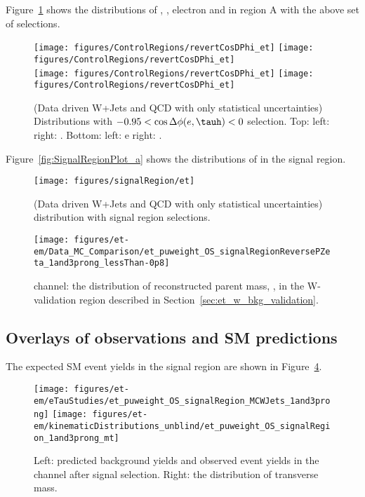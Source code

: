 Figure~\ref{fig:revertCosDPhi_et} shows the distributions of \meffetau, \ETslash, 
electron \pt and \tauh \pt in region A with the above set of selections. 

\begin{figure}\centering
  \texttt{[image: figures/ControlRegions/revertCosDPhi\_et]}
  \texttt{[image: figures/ControlRegions/revertCosDPhi\_et]}\\
  \texttt{[image: figures/ControlRegions/revertCosDPhi\_et]}
  \texttt{[image: figures/ControlRegions/revertCosDPhi\_et]}
  \caption{\label{fig:revertCosDPhi_et} (Data driven W+Jets and QCD with only statistical uncertainties)
 Distributions with $-0.95 < \cos{\Delta \phi (e,\tauh)} < 0$ selection. Top: left: 
\meffetau right: \ETslash. Bottom: left: e \pt right: \tauh \pt.}
\end{figure}

Figure~\ref{fig:SignalRegionPlot_a} shows the distributions of \meffmtau in 
the signal region.%

\begin{figure}\centering
  \texttt{[image: figures/signalRegion/et]}
  \caption{\label{fig:signalRegion_et} (Data driven W+Jets and QCD with only statistical uncertainties)
 \meffmtau distribution with signal region selections.}
\end{figure}


\iffalse

\begin{figure}\centering
  \texttt{[image: figures/et-em/Data\_MC\_Comparison/et\_puweight\_OS\_signalRegionReversePZeta\_1and3prong\_lessThan-0p8]}
  \caption{\label{fig:et_meff_flipped_pz} \teth channel: the
    distribution of reconstructed parent mass, \meffetau, in the
    W-validation region described in
    Section~\ref{sec:et_w_bkg_validation}.}
\end{figure}

\clearpage
\subsection{Overlays of observations and SM predictions}
\label{sec:et_overlays}

The expected SM event yields in the signal region are shown in
Figure~\ref{fig:etau_sm_template_and_mt}.
\begin{figure}\centering
  \texttt{[image: figures/et-em/eTauStudies/et\_puweight\_OS\_signalRegion\_MCWJets\_1and3prong]}
  \texttt{[image: figures/et-em/kinematicDistributions\_unblind/et\_puweight\_OS\_signalRegion\_1and3prong\_mt]}
  \caption{\label{fig:etau_sm_template_and_mt} Left: predicted
    background yields and observed event yields in the \teth channel
    after signal selection.  Right: the distribution of transverse
    mass.}
\end{figure}

